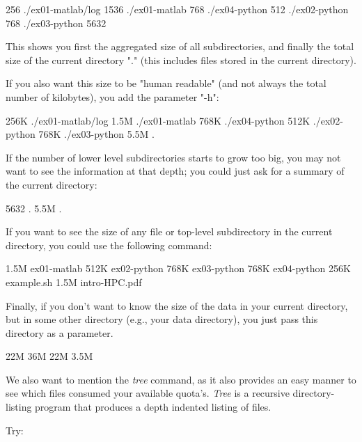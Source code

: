 \begin{prompt}
256 ./ex01-matlab/log
1536 ./ex01-matlab
768 ./ex04-python
512 ./ex02-python
768 ./ex03-python
5632
\end{prompt}

This shows you first the aggregated size of all subdirectories, and finally the
total size of the current directory "." (this includes files stored in the
current directory).

If you also want this size to be "human readable" (and not always the total
number of kilobytes), you add the parameter "-h":

\begin{prompt}
256K ./ex01-matlab/log
1.5M ./ex01-matlab
768K ./ex04-python
512K ./ex02-python
768K ./ex03-python
5.5M .
\end{prompt}

If the number of lower level subdirectories starts to grow too big, you may not
want to see the information at that depth; you could just ask for a summary of
the current directory:

\begin{prompt}
5632 .
5.5M .
\end{prompt}

If you want to see the size of any file or top-level subdirectory in the
current directory, you could use the following command:

\begin{prompt}
1.5M ex01-matlab
512K ex02-python
768K ex03-python
768K ex04-python
256K example.sh
1.5M intro-HPC.pdf
\end{prompt}


Finally, if you don't want to know the size of the data in your current
directory, but in some other directory (e.g., your data directory), you just
pass this directory as a parameter.

\begin{prompt}
22M %
36M %
22M %
3.5M %
\end{prompt}

We also want to mention the \emph{tree} command, as it also provides an easy
manner to see which files consumed your available quota's. \emph{Tree} is a
recursive directory-listing program that produces a depth indented listing of
files.

Try:

\begin{prompt}
\end{prompt}
